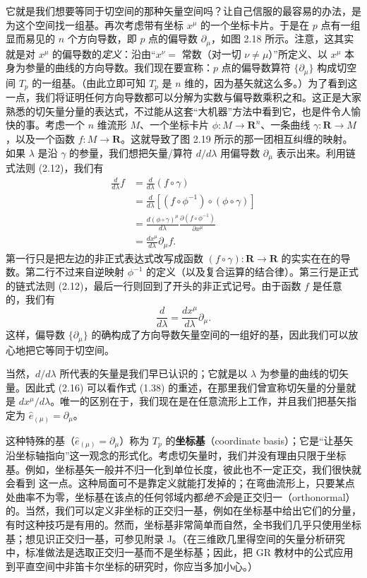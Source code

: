 它就是我们想要等同于切空间的那种矢量空间吗？让自己信服的最容易的办法，是为这个空间找一组基。再次考虑带有坐标 $x^\mu$ 的一个坐标卡片。于是在 $p$ 点有一组显而易见的 $n$ 个方向导数，即 $p$ 点的偏导数 $\partial_\mu$，如图 2.18 所示。注意，这其实就是对 $x^\mu$ 的偏导数的\emph{定义}：沿由“$x^\nu=$ 常数（对一切 $\nu\neq\mu$）”所定义、以 $x^\mu$ 本身为参量的曲线的方向导数。我们现在要宣称：$p$ 点的偏导数算符 $\{\partial_\mu\}$ 构成切空间 $T_p$ 的一组基。（由此立即可知 $T_p$ 是 $n$ 维的，因为基矢就这么多。）为了看到这一点，我们将证明任何方向导数都可以分解为实数与偏导数乘积之和。这正是大家熟悉的切矢量分量的表达式，不过能从这套“大机器”方法中看到它，也是件令人愉快的事。考虑一个 $n$ 维流形 $M$、一个坐标卡片 $\phi:M\to\mathbf{R}^n$、一条曲线 $\gamma:\mathbf{R}\to M$，以及一个函数 $f:M\to\mathbf{R}$。这就导致了图 2.19 所示的那一团相互纠缠的映射。如果 $\lambda$ 是沿 $\gamma$ 的参量，我们想把矢量/算符 $d/d\lambda$ 用偏导数 $\partial_\mu$ 表示出来。利用链式法则 (2.12)，我们有
\begin{align*}
\frac{d}{d\lambda}f&=\frac{d}{d\lambda}(f\circ\gamma)\\
&=\frac{d}{d\lambda}\left[(f\circ\phi^{-1})\circ(\phi\circ\gamma)\right]\\
&=\frac{d(\phi\circ\gamma)^\mu}{d\lambda}\frac{\partial(f\circ\phi^{-1})}{\partial x^\mu}\\
&=\frac{dx^\mu}{d\lambda}\partial_\mu f. \tag{2.15}
\end{align*}
第一行只是把左边的非正式表达式改写成函数 $(f\circ\gamma):\mathbf{R}\to\mathbf{R}$ 的实实在在的导数。第二行不过来自逆映射 $\phi^{-1}$ 的定义（以及复合运算的结合律）。第三行是正式的链式法则 (2.12)，最后一行则回到了开头的非正式记号。由于函数 $f$ 是任意的，我们有
\begin{equation*}
\frac{d}{d\lambda}=\frac{dx^\mu}{d\lambda}\partial_\mu. \tag{2.16}
\end{equation*}
这样，偏导数 $\{\partial_\mu\}$ 的确构成了方向导数矢量空间的一组好的基，因此我们可以放心地把它等同于切空间。

当然，$d/d\lambda$ 所代表的矢量是我们早已认识的；它就是以 $\lambda$ 为参量的曲线的切矢量。因此式 (2.16) 可以看作式 (1.38) 的重述，在那里我们曾宣称切矢量的分量就是 $dx^\mu/d\lambda$。唯一的区别在于，我们现在是在任意流形上工作，并且我们把基矢指定为 $\hat{e}_{(\mu)}=\partial_\mu$。

这种特殊的基（$\hat{e}_{(\mu)}=\partial_\mu$）称为 $T_p$ 的\textbf{坐标基}（coordinate basis）；它是“让基矢沿坐标轴指向”这一观念的形式化。考虑切矢量时，我们并没有理由只限于坐标基。例如，坐标基矢一般并不归一化到单位长度，彼此也不一定正交，我们很快就会看到
这一点。这种局面可不是靠定义就能打发掉的；在弯曲流形上，只要某点处曲率不为零，坐标基在该点的任何邻域内都\emph{绝不会}是正交归一（orthonormal）的。当然，我们可以定义非坐标的正交归一基，例如在坐标基中给出它们的分量，有时这种技巧是有用的。然而，坐标基非常简单而自然，全书我们几乎只使用坐标基；想见识正交归一基，可参见附录 J。（在三维欧几里得空间的矢量分析研究中，标准做法是选取正交归一基而不是坐标基；因此，把 GR 教材中的公式应用到平直空间中非笛卡尔坐标的研究时，你应当多加小心。）

